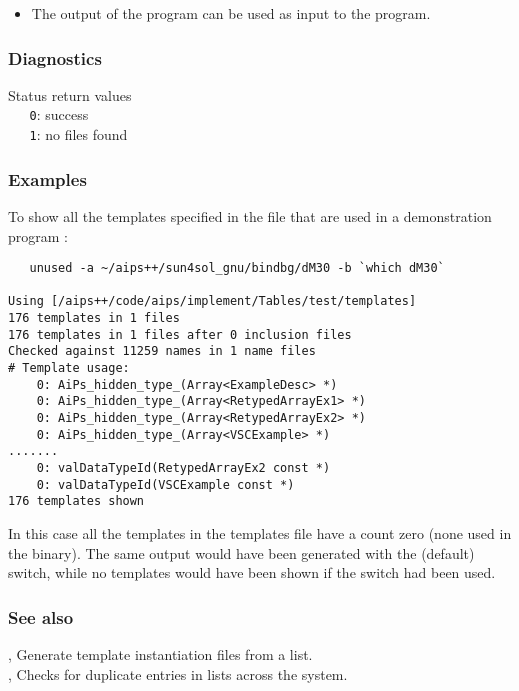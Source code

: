 \begin{itemize}
\item
   The output of the program can be used as input to the 
   program. 
\end{itemize}

\subsubsection*{Diagnostics}

Status return values
\\ \verb+   0+: success
\\ \verb+   1+: no files found

\subsubsection*{Examples}

To show all the templates specified in the  file
that are used in a demonstration program :

\begin{verbatim}
   unused -a ~/aips++/sun4sol_gnu/bindbg/dM30 -b `which dM30`

Using [/aips++/code/aips/implement/Tables/test/templates]
176 templates in 1 files
176 templates in 1 files after 0 inclusion files
Checked against 11259 names in 1 name files
# Template usage: 
    0: AiPs_hidden_type_(Array<ExampleDesc> *)
    0: AiPs_hidden_type_(Array<RetypedArrayEx1> *)
    0: AiPs_hidden_type_(Array<RetypedArrayEx2> *)
    0: AiPs_hidden_type_(Array<VSCExample> *)
.......
    0: valDataTypeId(RetypedArrayEx2 const *)
    0: valDataTypeId(VSCExample const *)
176 templates shown
\end{verbatim}

In this case all the templates in the templates file have a count zero (none
used in the binary). The same output would have been generated with the
(default)  switch, while no templates would have been shown if the
 switch had been used.


\subsubsection*{See also}

, Generate template instantiation files from a list.\\
, Checks for duplicate entries in  lists
   across the system.

